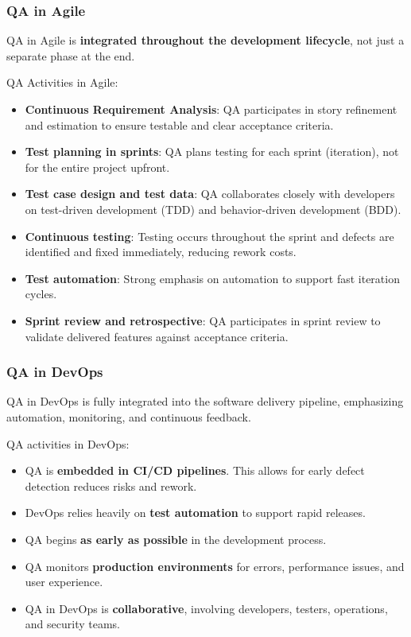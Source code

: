 \subsubsection{QA in Agile}

\indent 

QA in Agile is \textbf{integrated throughout the development lifecycle}, not just a separate phase at the end.

QA Activities in Agile:

\begin{itemize}
    \item \textbf{Continuous Requirement Analysis}: QA participates in story refinement and estimation to ensure testable and clear acceptance criteria.
    \item \textbf{Test planning in sprints}: QA plans testing for each sprint (iteration), not for the entire project upfront.
    \item \textbf{Test case design and test data}: QA collaborates closely with developers on test-driven development (TDD) and behavior-driven development (BDD).
    \item \textbf{Continuous testing}: Testing occurs throughout the sprint and defects are identified and fixed immediately, reducing rework costs.
    \item \textbf{Test automation}: Strong emphasis on automation to support fast iteration cycles.
    \item \textbf{Sprint review and retrospective}: QA participates in sprint review to validate delivered features against acceptance criteria.
\end{itemize}

\subsubsection{QA in DevOps}

\indent

QA in DevOps is fully integrated into the software delivery pipeline, emphasizing automation, monitoring, and continuous feedback.

QA activities in DevOps:

\begin{itemize}
    \item QA is \textbf{embedded in CI/CD pipelines}. This allows for early defect detection reduces risks and rework.
    \item DevOps relies heavily on \textbf{test automation} to support rapid releases.
    \item QA begins \textbf{as early as possible} in the development process.
    \item QA monitors \textbf{production environments} for errors, performance issues, and user experience.
    \item QA in DevOps is \textbf{collaborative}, involving developers, testers, operations, and security teams.
\end{itemize}

